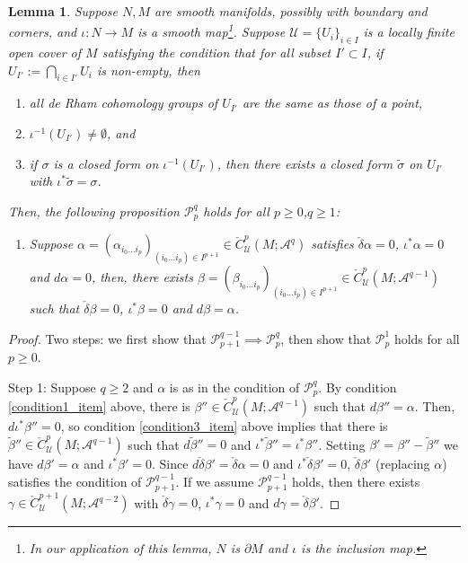 \documentclass[11pt]{article}
\newtheorem{lmm}[thm]{Lemma}
\theoremstyle{definition}
\theoremstyle{remark}
\def\cA{\mathcal{A}}
\def\cP{\mathcal{P}}
\def\cU{\mathcal{U}}
\begin{document}
\begin{appendices}
\begin{lmm}\label{cechform_lmm}
Suppose $N,M$ are smooth manifolds, possibly with boundary and corners, and $\iota: N\to M$ is a smooth map\footnote{%
In our application of this lemma, $N$ is $\partial M$
and $\iota$ is the inclusion map.}. 
Suppose $\cU=\{U_i\}_{i\in I}$ is a locally finite open cover of $M$ satisfying the condition that for all subset $I'\subset I$, if $U_{I'}:=\bigcap_{i\in I'}U_i$ is non-empty, then 
\begin{enumerate}
\item \label{condition1_item} all de Rham cohomology groups of $U_{I'}$ are the same as those of a point, 
\item \label{condition2_item} $\iota^{-1}(U_{I'})\neq\emptyset$, and 
\item \label{condition3_item} if $\sigma$ is a closed form on $\iota^{-1}(U_{I'})$, then there exists a closed form $\tilde\sigma$ on $U_{I'}$ with $\iota^*\tilde\sigma=\sigma$. 
\end{enumerate}
Then, the following proposition $\cP^q_p$ holds for all $p\ge0$,$q\ge1$: 
\begin{enumerate}[noitemsep, nolistsep, label=$\cP^q_p$:]
\item Suppose 
$\alpha=(\alpha_{i_0\ldots i_p})_{(i_0\ldots i_p)\in I^{p+1}}\in\check{C}^p_{\cU}(M;\cA^q)$
satisfies $\check{\delta}\alpha=0$, $\iota^*\alpha=0$ and $d\alpha=0$,
then, there exists 
$\beta=(\beta_{i_0\ldots i_p})_{(i_0\ldots i_p)\in I^{p+1}}\in\check{C}^p_{\cU}(M;\cA^{q-1})$
such that $\check{\delta}\beta=0$, $\iota^*\beta=0$ and $d\beta=\alpha$. 
\end{enumerate}
\end{lmm}
\begin{proof}
Two steps: we first show that $\cP^{q-1}_{p+1}\implies\cP^{q}_p$, then show that $\cP^1_{p}$ holds for all $p\ge0$. 

Step 1: Suppose $q\ge2$ and $\alpha$ is as in the condition of $\cP^q_p$. 
By condition \ref{condition1_item} above, there is $\beta''\in\check{C}^p_{\cU}(M;\cA^{q-1})$ such that $d\beta''=\alpha$. Then, $d\iota^*\beta''=0$, so condition \ref{condition3_item} above implies that there is $\tilde\beta''\in\check{C}^p_{\cU}(M;\cA^{q-1})$ such that $d\tilde\beta''=0$ and $\iota^*\tilde\beta''=\iota^*\beta''$.
Setting $\beta'=\beta''-\tilde\beta''$ we have $d\beta'=\alpha$ and $\iota^*\beta'=0$. 
Since $d\check\delta \beta'=\check\delta\alpha=0$ and $\iota^*\check\delta\beta'=0$, $\check\delta\beta'$ (replacing $\alpha$) satisfies the condition of $\cP^{q-1}_{p+1}$. 
If we assume $\cP^{q-1}_{p+1}$ holds, then there exists $\gamma\in\check{C}^{p+1}_{\cU}(M;\cA^{q-2})$ with $\check\delta\gamma=0$, $\iota^*\gamma=0$ and $d\gamma=\check\delta\beta'$. 


\end{proof}
\end{appendices}
\end{document}
